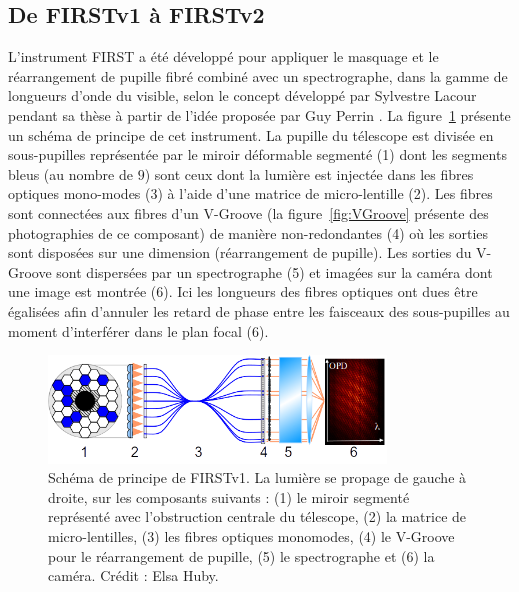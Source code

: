 \subsection{De FIRSTv1 à FIRSTv2}

L'instrument \ac{FIRST} a été développé \citep{kotani2008} pour appliquer le masquage et le réarrangement de pupille fibré combiné avec un spectrographe, dans la gamme de longueurs d'onde du visible, selon le concept développé par Sylvestre Lacour pendant sa thèse \citep{lacour2010} à partir de l'idée proposée par Guy Perrin \citep{perrin2006}. La figure~\ref{fig:FIRSTv1Scheme} présente un schéma de principe de cet instrument. La pupille du télescope est divisée en sous-pupilles représentée par le miroir déformable segmenté (1) dont les segments bleus (au nombre de $9$) sont ceux dont la lumière est injectée dans les fibres optiques mono-modes (3) à l'aide d'une matrice de micro-lentille (2). Les fibres sont connectées aux fibres d'un V-Groove (la figure~\ref{fig:VGroove} présente des photographies de ce composant) de manière non-redondantes (4) où les sorties sont disposées sur une dimension (réarrangement de pupille). Les sorties du V-Groove sont dispersées par un spectrographe (5) et imagées sur la caméra dont une image est montrée (6). Ici les longueurs des fibres optiques ont dues être égalisées afin d'annuler les retard de phase entre les faisceaux des sous-pupilles au moment d'interférer dans le plan focal (6).

\begin{figure}[ht!]
    \centering
    \includegraphics[width=0.8\textwidth]{Figure_Chap1/FIRSTv1Scheme_36Outputs_Fringes_b.png}
    \caption[Schéma de principe de FIRSTv1.]{Schéma de principe de FIRSTv1. La lumière se propage de gauche à droite, sur les composants suivants : (1) le miroir segmenté représenté avec l'obstruction centrale du télescope, (2) la matrice de micro-lentilles, (3) les fibres optiques monomodes, (4) le V-Groove pour le réarrangement de pupille, (5) le spectrographe et (6) la caméra. Crédit : Elsa Huby.}
    \label{fig:FIRSTv1Scheme}
\end{figure}

